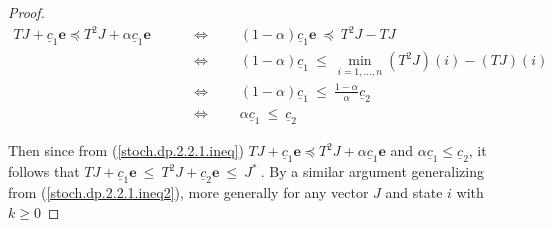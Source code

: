 \begin{enumerate}
\begin{proof}
\begin{align*}
	T J  + \underline{c}_1 \bm{e}  \preceq T^2 J  + \alpha \underline{c}_1 \bm{e}
	&\qquad \stackrel{}{\Longleftrightarrow}\qquad
	(1-\alpha) \underline{c}_1 \bm{e} ~\preceq~ T^2 J - T J\\
	&\qquad \stackrel{}{\Longleftrightarrow} \qquad
	(1-\alpha) \underline{c}_1  ~\leq~ \min_{i = 1, \ldots, n}    (T^2 J)(i) - (T J)(i)\\
		&\qquad \stackrel{}{\Longleftrightarrow} \qquad
	(1-\alpha) \underline{c}_1  ~\leq~  \frac{1-\alpha}{\alpha} \underline{c}_2\\
			&\qquad \Longleftrightarrow \qquad
	\alpha  \underline{c}_1  ~\leq~ \underline{c}_2
\end{align*}

Then since from (\ref{stoch.dp.2.2.1.ineq})
$T J  + \underline{c}_1 \bm{e}  \preceq T^2 J  + \alpha \underline{c}_1 \bm{e}$ and $\alpha \underline{c}_1 \leq \underline{c}_2$, it follows that \(T J  + \underline{c}_1 \bm{e}  ~\leq~ T^2 J  + \underline{c}_2 \bm{e} ~\leq~ J^*~.\) By a similar argument generalizing from (\ref{stoch.dp.2.2.1.ineq2}), more generally for any vector \(J\) and state \(i\) with \(k \geq 0\)


%


\end{proof}
\end{enumerate}
